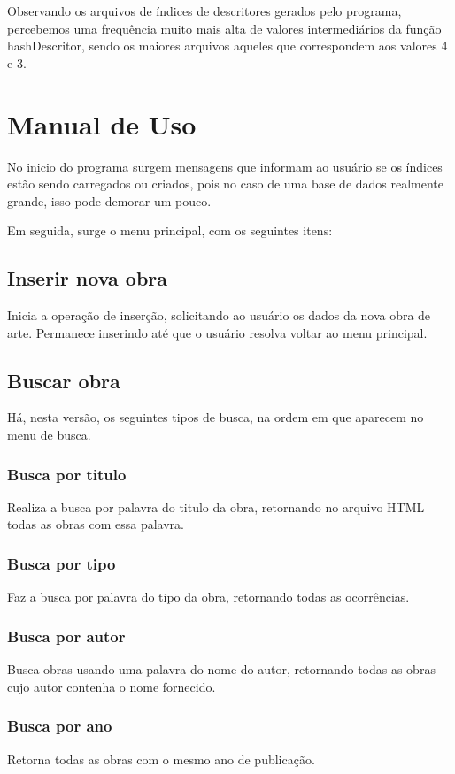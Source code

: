 \documentclass[10pt,a4paper,draft]{article}
\begin{document}
Observando os arquivos de índices de descritores gerados pelo programa, percebemos uma frequência muito mais alta de valores intermediários da função hashDescritor, sendo os maiores arquivos aqueles que correspondem aos valores 4 e 3.

\newpage 
\section{Manual de Uso}
No inicio do programa surgem mensagens que informam ao usuário se os índices estão sendo carregados ou criados, pois no caso de uma base de dados realmente grande, isso pode demorar um pouco.

Em seguida, surge o menu principal, com os seguintes itens:

\subsection{Inserir nova obra}
Inicia a operação de inserção, solicitando ao usuário os dados da nova obra de arte. Permanece inserindo até que o usuário resolva voltar ao menu principal.

\subsection{Buscar obra}
Há, nesta versão, os seguintes tipos de busca, na ordem em que aparecem no menu de busca.

\subsubsection{Busca por titulo}
Realiza a busca por palavra do titulo da obra, retornando no arquivo HTML todas as obras com essa palavra.

\subsubsection{Busca por tipo}
Faz a busca por palavra do tipo da obra, retornando todas as ocorrências.

\subsubsection{Busca por autor}
Busca obras usando uma palavra do nome do autor, retornando todas as obras cujo autor contenha o nome fornecido.

\subsubsection{Busca por ano}
Retorna todas as obras com o mesmo ano de publicação.
\end{document}
